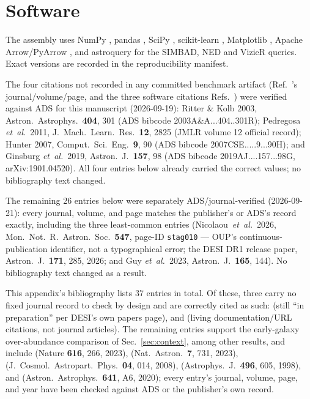 \documentclass[aps,prd,twocolumn,superscriptaddress,nofootinbib,longbibliography,floatfix]{revtex4-2}
\newcommand{\etal}{\textit{et~al.}}
\begin{document}
\appendix

\section{Software}
\label{app:software}
The assembly uses NumPy \cite{Harris2020}, pandas \cite{McKinney2010},
SciPy \cite{Virtanen2020}, scikit-learn \cite{Pedregosa2011},
Matplotlib \cite{Hunter2007}, Apache Arrow/PyArrow \cite{ApacheArrow}, and
astroquery \cite{Ginsburg2019} for the SIMBAD, NED and VizieR queries. Exact
versions are recorded in the reproducibility manifest.

The four citations not recorded in any committed benchmark artifact
(Ref.~\cite{RitterKolb2003}'s journal/volume/page, and the three software
citations Refs.~\cite{Pedregosa2011,Hunter2007,Ginsburg2019}) were verified
against ADS for this manuscript (2026-09-19): Ritter \& Kolb 2003, Astron.\ Astrophys.\ \textbf{404}, 301
(ADS bibcode 2003A\&A...404..301R); Pedregosa \etal\ 2011, J.\ Mach.\ Learn.\
Res.\ \textbf{12}, 2825 (JMLR volume 12 official record); Hunter 2007,
Comput.\ Sci.\ Eng.\ \textbf{9}, 90 (ADS bibcode 2007CSE.....9...90H); and
Ginsburg \etal\ 2019, Astron.\ J.\ \textbf{157}, 98 (ADS bibcode
2019AJ....157...98G, arXiv:1901.04520). All four entries below already
carried the correct values; no bibliography text changed.

The remaining 26 entries below were separately ADS/journal-verified
(2026-09-21): every journal, volume, and page matches the publisher's or
ADS's record exactly, including the three least-common entries
(Nicolaou~\etal\ 2026, Mon.\ Not.\ R.\ Astron.\ Soc.\ \textbf{547}, page-ID
\texttt{stag010} --- OUP's continuous-publication identifier, not a
typographical error; the DESI DR1 release paper, Astron.\ J.\
\textbf{171}, 285, 2026; and Guy \etal\ 2023, Astron.\ J.\ \textbf{165},
144). No bibliography text changed as a result.

This appendix's bibliography lists $37$ entries in total. Of these, three
carry no fixed journal record to check by design and are correctly cited as
such: \cite{Redrock} (still ``in preparation'' per DESI's own papers page),
and \cite{DESIBitmasks,ApacheArrow} (living documentation/URL citations, not
journal articles). The remaining entries support the early-galaxy
over-abundance comparison of Sec.~\ref{sec:context}, among other results,
and include \cite{Labbe2023} (Nature \textbf{616}, 266, 2023),
\cite{BoylanKolchin2023} (Nat.\ Astron.\ \textbf{7}, 731, 2023),
\cite{LoVerde2008} (J.\ Cosmol.\ Astropart.\ Phys.\ \textbf{04}, 014, 2008),
\cite{EisensteinHu1998} (Astrophys.\ J.\ \textbf{496}, 605, 1998), and
\cite{Planck2018} (Astron.\ Astrophys.\ \textbf{641}, A6, 2020); every
entry's journal, volume, page, and year have been checked against ADS or
the publisher's own record.
\end{document}

